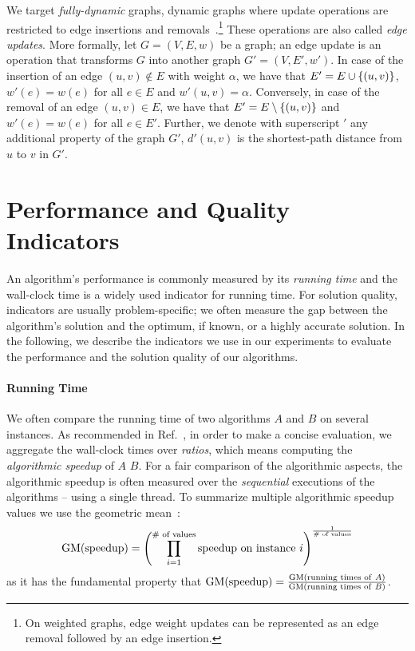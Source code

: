 We target \emph{fully-dynamic} graphs, \ie dynamic graphs
where update operations are restricted to edge insertions and
removals~\cite{DBLP:books/crc/99/EppsteinGI99}.\footnote{On weighted graphs,
edge weight updates can be represented as an edge removal followed by an edge
insertion.} These operations are also called \emph{edge updates}.
More formally, let $G = (V, E, w)$ be a graph; an edge update is an operation
that transforms $G$ into another graph $G' = (V, E', w')$.
In case of the insertion of an edge $(u, v) \notin E$ with weight $\alpha$, we
have that $E' = E \cup \set{(u, v)}$, $w'(e) = w(e)$ for all $e \in E$ and
$w'(u, v) = \alpha$.
Conversely, in case of the removal of an edge $(u, v) \in E$, we have that
$E' = E \setminus \set{(u, v)}$ and $w'(e) = w(e)$ for all $e \in E'$.
Further, we denote with superscript $'$ any additional property of the graph $G'$,
\eg $d'(u, v)$ is the shortest-path distance from $u$ to $v$ in $G'$.


\section{Performance and Quality Indicators}
\label{sec:prelim-performance-quality}
%
An algorithm's performance is commonly measured by its \emph{running time}
and the wall-clock time is a widely used indicator for running time. For
solution quality, indicators are usually problem-specific; we often measure the
gap between the algorithm's solution and the optimum, if known, or a highly
accurate solution.
In the following, we describe the indicators we use in our experiments to
evaluate the performance and the solution quality of our algorithms.

\paragraph{Running Time}
We often compare the running time of two algorithms $A$ and $B$ on several
instances. As recommended in Ref.~\cite{DBLP:journals/algorithms/AngrimanGLMNPT19},
in order to make a concise evaluation, we aggregate the wall-clock times over
\emph{ratios}, which means computing the \emph{algorithmic speedup} of
$A$ \wrt $B$. For a fair comparison of the algorithmic
aspects, the algorithmic speedup is often measured over the \emph{sequential}
executions of the algorithms -- \ie using a single thread.
To summarize multiple algorithmic speedup values we use the geometric
mean~\cite{DBLP:journals/ior/Bixby02}:
%
\[
\gmean(\text{speedup}) =
\roundb{\prod_{i = 1}^{\text{\# of values}}
\text{speedup on instance}\ i}^{\frac{1}{\text{\# of values}}}
\]
%
as it has the fundamental property that
$\operatorname{GM}(\text{speedup}) =
\frac{\operatorname{GM}(\text{running times of}\ A)}{\operatorname{GM}(\text{running times of}\ B)}$.

